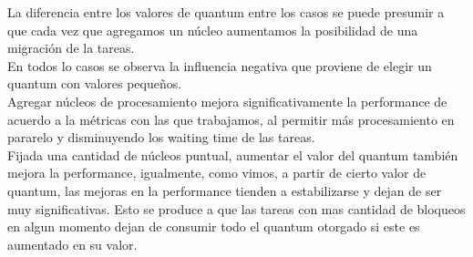 \indent \indent La diferencia entre los valores de quantum entre los casos 
se puede presumir a que cada vez que agregamos un núcleo aumentamos 
la posibilidad de una migración de la tareas.\\
\indent \indent En todos lo casos se observa la influencia negativa que proviene 
de elegir un quantum con valores pequeños.\\
\indent \indent Agregar núcleos de procesamiento mejora significativamente 
la performance de acuerdo a la métricas con las que
trabajamos, al permitir más procesamiento en pararelo y disminuyendo 
los waiting time de las tareas.\\
\indent \indent  Fijada una cantidad de núcleos puntual, aumentar el valor del
quantum también mejora la performance, igualmente, como vimos, a partir de cierto valor 
de quantum, las mejoras en la performance tienden a estabilizarse y dejan de ser 
muy significativas. 
Esto se produce a que las tareas con mas cantidad de bloqueos en 
algun momento dejan de consumir todo el quantum otorgado si este es aumentado en su valor.
